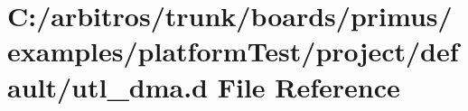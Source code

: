 \hypertarget{boards_2primus_2examples_2platform_test_2project_2default_2utl__dma_8d}{\section{C\-:/arbitros/trunk/boards/primus/examples/platform\-Test/project/default/utl\-\_\-dma.d File Reference}
\label{boards_2primus_2examples_2platform_test_2project_2default_2utl__dma_8d}
}
